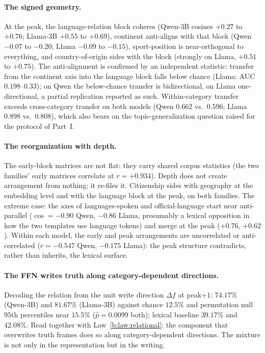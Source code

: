 \documentclass[11pt]{article}
\begin{document}
\paragraph{The signed geometry.} At the peak, the language-relation block
coheres (Qwen-3B cosines $+0.27$ to $+0.76$; Llama-3B $+0.55$ to $+0.69$),
continent anti-aligns with that block (Qwen $-0.07$ to $-0.20$; Llama
$-0.09$ to $-0.15$), sport-position is near-orthogonal to everything, and
country-of-origin sides with the block (strongly on Llama, $+0.51$ to
$+0.75$). The anti-alignment is confirmed by an independent statistic:
transfer from the continent axis into the language block falls below
chance (Llama: AUC $0.198$--$0.33$); on Qwen the below-chance transfer is
bidirectional, on Llama one-directional, a partial replication reported as
such. Within-category transfer exceeds cross-category transfer on both
models (Qwen $0.662$ vs.\ $0.596$; Llama $0.898$ vs.\ $0.808$), which also
bears on the topic-generalization question raised for the protocol of Part~I.

\paragraph{The reorganization with depth.} The early-block matrices are
not flat: they carry shared corpus statistics (the two families' early
matrices correlate at $r = +0.934$). Depth does not create arrangement from
nothing; it re-files it. Citizenship sides with geography at the embedding
level and with the language block at the peak, on both families. The
extreme case: the axes of languages-spoken and official-language start near
anti-parallel ($\cos = -0.90$ Qwen, $-0.86$ Llama, presumably a lexical
opposition in how the two templates use language tokens) and merge at the
peak ($+0.76$, $+0.62$). Within each model, the early and peak
arrangements are uncorrelated or anti-correlated ($r = -0.547$ Qwen,
$-0.175$ Llama): the peak structure contradicts, rather than inherits, the
lexical surface.

\paragraph{The FFN writes truth along category-dependent directions.}
Decoding the relation from the unit write direction $\Delta f$ at
peak$+1$: $74.17\%$ (Qwen-3B) and $81.67\%$ (Llama-3B) against chance
$12.5\%$ and permutation null $95$th percentiles near $15.5\%$
($\hat p = 0.0099$ both); lexical baseline $39.17\%$ and $42.08\%$. Read
together with Law~\ref{b:law:relational}: the component that overwrites truth
frames does so along category-dependent directions. The mixture is not
only in the representation but in the writing.
\end{document}
